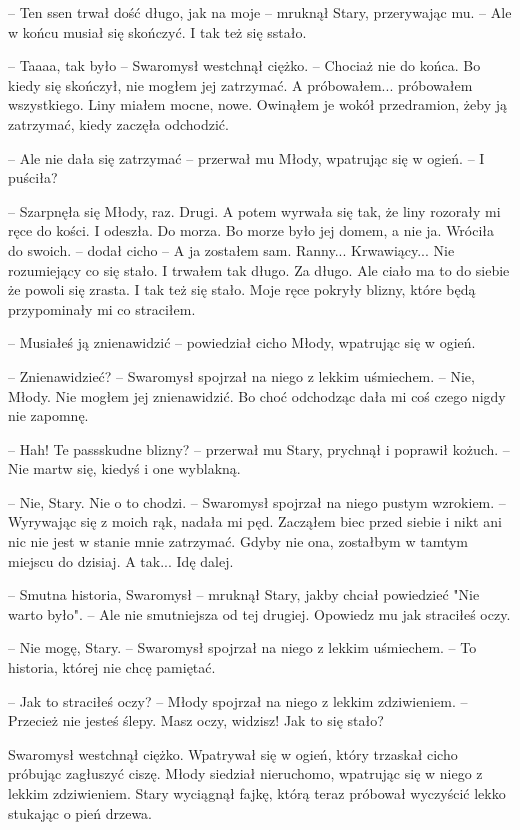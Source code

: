 \par\noindent-- Ten ssen trwał dość długo, jak na moje -- mruknął Stary, przerywając mu. -- Ale w końcu musiał się skończyć. I tak też się sstało.
\par\noindent-- Taaaa, tak było -- Swaromysł westchnął ciężko. -- Chociaż nie do końca. Bo kiedy się skończył, nie mogłem jej zatrzymać. A próbowałem... próbowałem wszystkiego. Liny miałem mocne, nowe. Owinąłem je wokół przedramion, żeby ją zatrzymać, kiedy zaczęła odchodzić.
\par\noindent-- Ale nie dała się zatrzymać -- przerwał mu Młody, wpatrując się w ogień. -- I puściła?
\par\noindent-- Szarpnęła się Młody, raz. Drugi. A potem wyrwała się tak, że liny rozorały mi ręce do kości. I odeszła. Do morza. Bo morze było jej domem, a nie ja. Wróciła do swoich. -- dodał cicho -- A ja zostałem sam. Ranny... Krwawiący... Nie rozumiejący co się stało. I trwałem tak długo. Za długo. Ale ciało ma to do siebie że powoli się zrasta. I tak też się stało. Moje ręce pokryły blizny, które będą przypominały mi co straciłem.
\par\noindent-- Musiałeś ją znienawidzić -- powiedział cicho Młody, wpatrując się w ogień.
\par\noindent-- Znienawidzieć? -- Swaromysł spojrzał na niego z lekkim uśmiechem. -- Nie, Młody. Nie mogłem jej znienawidzić. Bo choć odchodząc dała mi coś czego nigdy nie zapomnę. 
\par\noindent-- Hah! Te passskudne blizny? -- przerwał mu Stary, prychnął i poprawił kożuch. -- Nie martw się, kiedyś i one wyblakną.
\par\noindent-- Nie, Stary. Nie o to chodzi. -- Swaromysł spojrzał na niego pustym wzrokiem. -- Wyrywając się z moich rąk, nadała mi pęd. Zacząłem biec przed siebie i nikt ani nic nie jest w stanie mnie zatrzymać. Gdyby nie ona, zostałbym w tamtym miejscu do dzisiaj. A tak... Idę dalej.
\par\noindent-- Smutna historia, Swaromysł -- mruknął Stary, jakby chciał powiedzieć "Nie warto było". -- Ale nie smutniejsza od tej drugiej. Opowiedz mu jak straciłeś oczy.
\par\noindent-- Nie mogę, Stary. -- Swaromysł spojrzał na niego z lekkim uśmiechem. -- To historia, której nie chcę pamiętać.
\par\noindent-- Jak to straciłeś oczy? -- Młody spojrzał na niego z lekkim zdziwieniem. -- Przecież nie jesteś ślepy. Masz oczy, widzisz! Jak to się stało?
\par\indent Swaromysł westchnął ciężko. Wpatrywał się w ogień, który trzaskał cicho próbując zagłuszyć ciszę. Młody siedział nieruchomo, wpatrując się w niego z lekkim zdziwieniem. Stary wyciągnął fajkę, którą teraz próbował wyczyścić lekko stukając o pień drzewa. 
